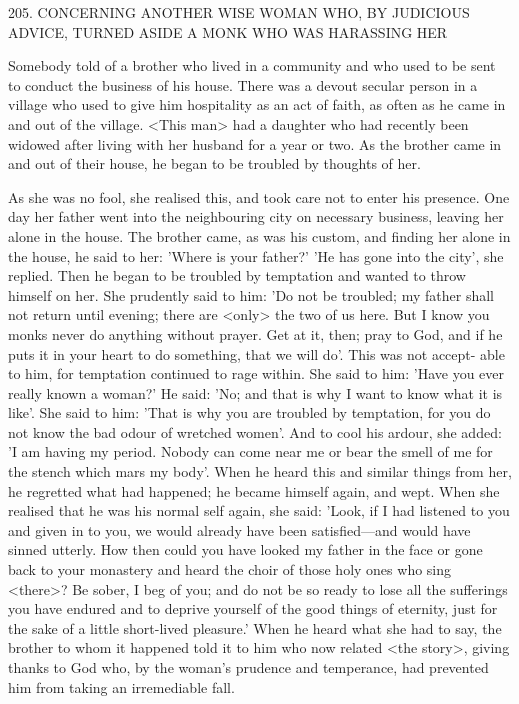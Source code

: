 205. CONCERNING ANOTHER WISE WOMAN
WHO, BY JUDICIOUS ADVICE,
TURNED ASIDE A MONK WHO WAS HARASSING HER

Somebody told of a brother who lived in a community and who
used to be sent to conduct the business of his house. There was a
devout secular person in a village who used to give him hospitality
as an act of faith, as often as he came in and out of the village.
<This man> had a daughter who had recently been widowed after
living with her husband for a year or two. As the brother came in
and out of their house, he began to be troubled by thoughts of her.

As she was no fool, she realised this, and took care not to enter his
presence. One day her father went into the neighbouring city on
necessary business, leaving her alone in the house. The brother
came, as was his custom, and finding her alone in the house, he said
to her: 'Where is your father?' 'He has gone into the city', she
replied. Then he began to be troubled by temptation and wanted to
throw himself on her. She prudently said to him: 'Do not be
troubled; my father shall not return until evening; there are <only>
the two of us here. But I know you monks never do anything
without prayer. Get at it, then; pray to God, and if he puts it in
your heart to do something, that we will do'. This was not accept-
able to him, for temptation continued to rage within. She said to
him: 'Have you ever really known a woman?' He said: 'No; and that
is why I want to know what it is like'. She said to him: 'That is why
you are troubled by temptation, for you do not know the bad odour
of wretched women'. And to cool his ardour, she added: 'I am
having my period. Nobody can come near me or bear the smell of
me for the stench which mars my body'. When he heard this and
similar things from her, he regretted what had happened; he became
himself again, and wept. When she realised that he was his normal
self again, she said: 'Look, if I had listened to you and given in to
you, we would already have been satisfied—and would have sinned
utterly. How then could you have looked my father in the face or
gone back to your monastery and heard the choir of those holy ones
who sing <there>? Be sober, I beg of you; and do not be so ready
to lose all the sufferings you have endured and to deprive yourself
of the good things of eternity, just for the sake of a little short-lived
pleasure.' When he heard what she had to say, the brother to whom
it happened told it to him who now related <the story>, giving
thanks to God who, by the woman's prudence and temperance, had
prevented him from taking an irremediable fall.

